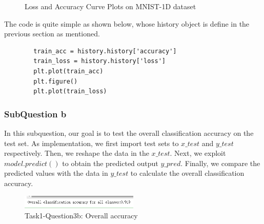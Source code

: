 \documentclass[conference]{IEEEtran}
\begin{document}
	\begin{figure}[h]
		\centering  %
		
		\caption{Loss and Accuracy Curve Plots on MNIST-1D dataset}
		\label{Fig.la}
	\end{figure}
	
	The code is quite simple as shown below, whose history object is define in the previous section as mentioned. 
	
	\begin{lstlisting}
		train_acc = history.history['accuracy']
		train_loss = history.history['loss']
		plt.plot(train_acc)
		plt.figure()
		plt.plot(train_loss)
	\end{lstlisting}
	
	\subsubsection{SubQuestion b}
	In this subquestion, our goal is to test the overall classification accuracy on the test set. As implementation, we first import test sets to $x\_test$ and $y\_test$ respectively. Then, we reshape the data in the $x\_test$. Next, we exploit $model.predict()$ to obtain the predicted output $y\_pred$. Finally, we compare the predicted values with the data in $y\_test$ to calculate the overall classification accuracy.\par
	\begin{figure}[h] 
		\centering
		\includegraphics[width=0.5\textwidth]{./graphs/T1Q3b.png}
		\caption{Task1-Question3b: Overall accuracy} 
		\label{Fig.t1q3b} 
	\end{figure}
	
\end{document}
